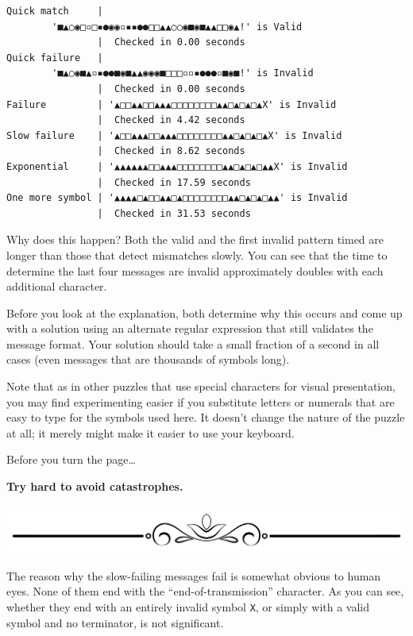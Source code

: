 \begin{verbatim}
Quick match     |
        '■▲○◉□▫□▪●◉◉▫▪▪●●□□▲▲○○◉■◉■▲▲□□◉▲!' is Valid
                |  Checked in 0.00 seconds
Quick failure   |
        '■▲○◉■▲▫▪●●■◉■▲▲◉◉◉■□□□▫▫▪●●●▫■◉■!' is Invalid
                |  Checked in 0.00 seconds
Failure         | '▲□□▲▲□□▲▲▲□□□□□□□□▲▲□▲□▲□▲X' is Invalid
                |  Checked in 4.42 seconds
Slow failure    | '▲□□▲▲▲□□▲▲▲□□□□□□□□▲▲□▲□▲□▲X' is Invalid
                |  Checked in 8.62 seconds
Exponential     | '▲▲▲▲▲▲□□▲▲▲□□□□□□□□▲▲□▲□▲□▲▲X' is Invalid
                |  Checked in 17.59 seconds
One more symbol | '▲▲▲▲□▲□□▲▲□▲□□□□□□□□▲▲□▲□▲□▲▲' is Invalid
                |  Checked in 31.53 seconds
\end{verbatim}

Why does this happen? Both the valid and the first invalid pattern timed
are longer than those that detect mismatches slowly. You can see that
the time to determine the last four messages are invalid approximately
doubles with each additional character.

Before you look at the explanation, both determine why this occurs and
come up with a solution using an alternate regular expression that still
validates the message format. Your solution should take a small fraction
of a second in all cases (even messages that are thousands of symbols
long).

Note that as in other puzzles that use special characters for visual
presentation, you may find experimenting easier if you substitute
letters or numerals that are easy to type for the symbols used here. It
doesn't change the nature of the puzzle at all; it merely might make it
easier to use your keyboard.

Before you turn the page\ldots{}

\textbf{Try hard to avoid catastrophes.}

\includegraphics{images/Elegant-Flourish-Frame-Extrapolated-19.svg}

\newpage

The reason why the slow-failing messages fail is somewhat obvious to
human eyes. None of them end with the ``end-of-transmission'' character.
As you can see, whether they end with an entirely invalid symbol
\texttt{X}, or simply with a valid symbol and no terminator, is not
significant.

